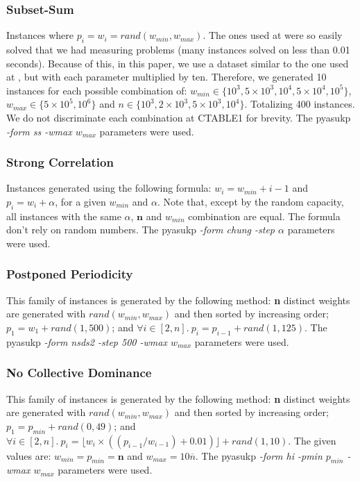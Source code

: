 \documentclass[runningheads,a4paper]{llncs}
\begin{document}
\subsubsection{Subset-Sum}\label{sec:subsetsum}
Instances where \(p_i = w_i = rand(w_{min}, w_{max})\). The ones used at \cite{CPYA} were so easily solved that we had measuring problems (many instances solved on less than 0.01 seconds). Because of this, in this paper, we use a dataset similar to the one used at \cite{CPYA}, but with each parameter multiplied by ten. Therefore, we generated 10 instances for each possible combination of: \(w_{min} \in \{10^3, 5\times10^3, 10^4, 5\times10^4, 10^5\}\), \(w_{max} \in \{5\times10^5, 10^6\}\) and \(n \in \{10^3, 2\times10^3, 5\times10^3, 10^4\}\). Totalizing 400 instances. We do not discriminate each combination at CTABLE1 for brevity. The pyasukp \emph{-form ss -wmax \(w_{max}\)} parameters were used.

\subsubsection{Strong Correlation}
Instances generated using the following formula: \(w_i = w_{min} + i - 1\) and \(p_i = w_i + \alpha\), for a given \(w_{min}\) and \(\alpha\).  Note that, except by the random capacity, all instances with the same \(\alpha\), \(\mathbf{n}\) and \(w_{min}\) combination are equal. The formula don't rely on random numbers. The pyasukp \emph{-form chung -step \(\alpha\) } parameters were used.

\subsubsection{Postponed Periodicity}
This family of instances is generated by the following method: \textbf{n} distinct weights are generated with \(rand(w_{min}, w_{max})\) and then sorted by increasing order; \(p_1 = w_1 + rand(1, 500)\); and \(\forall i \in [2, n].~p_i = p_{i-1} + rand(1, 125)\). The pyasukp \emph{-form nsds2 -step 500 -wmax \(w_{max}\)} parameters were used.

\subsubsection{No Collective Dominance}
This family of instances is generated by the following method: \textbf{n} distinct weights are generated with \(rand(w_{min}, w_{max})\) and then sorted by increasing order; \(p_1 = p_{min} + rand(0, 49)\); and \(\forall i \in [2, n].~p_i = \lfloor w_i \times ((p_{i-1}/w_{i-1}) + 0.01)\rfloor + rand(1, 10)\). The given values are: \(w_{min} = p_{min} = \mathbf{n}\) and \(w_{max} = 10\overline{n}\). The pyasukp \emph{-form hi -pmin \(p_{min}\) -wmax \(w_{max}\)} parameters were used.
\end{document}
